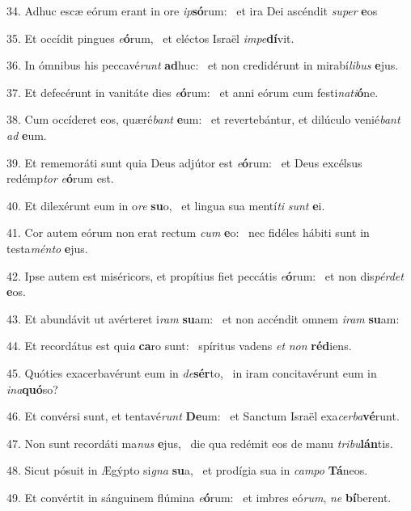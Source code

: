 34. Adhuc escæ eórum erant in ore \textit{ip}\textbf{só}rum: \ast\  et ira Dei ascéndit \textit{su}\textit{per} \textbf{e}os\

35. Et occídit pingues \textit{e}\textbf{ó}rum, \ast\  et eléctos Israël \textit{im}\textit{pe}\textbf{dí}vit.\

36. In ómnibus his peccavé\textit{runt} \textbf{ad}huc: \ast\  et non credidérunt in mirabí\textit{li}\textit{bus} \textbf{e}jus.\

37. Et defecérunt in vanitáte dies \textit{e}\textbf{ó}rum: \ast\  et anni eórum cum festi\textit{na}\textit{ti}\textbf{ó}ne.\

38. Cum occíderet eos, quæré\textit{bant} \textbf{e}um: \ast\  et revertebántur, et dilúculo venié\textit{bant} \textit{ad} \textbf{e}um.\

39. Et rememoráti sunt quia Deus adjútor est \textit{e}\textbf{ó}rum: \ast\  et Deus excélsus redémp\textit{tor} \textit{e}\textbf{ó}rum est.\

40. Et dilexérunt eum in o\textit{re} \textbf{su}o, \ast\  et lingua sua mentí\textit{ti} \textit{sunt} \textbf{e}i.\

41. Cor autem eórum non erat rectum \textit{cum} \textbf{e}o: \ast\  nec fidéles hábiti sunt in testa\textit{mén}\textit{to} \textbf{e}jus.\

42. Ipse autem est miséricors, et propítius fiet peccátis \textit{e}\textbf{ó}rum: \ast\  et non dis\textit{pér}\textit{det} \textbf{e}os.\

43. Et abundávit ut avérteret i\textit{ram} \textbf{su}am: \ast\  et non accéndit omnem \textit{i}\textit{ram} \textbf{su}am:\

44. Et recordátus est qui\textit{a} \textbf{ca}ro sunt: \ast\  spíritus vadens \textit{et} \textit{non} \textbf{réd}iens.\

45. Quóties exacerbavérunt eum in \textit{de}\textbf{sér}to, \ast\  in iram concitavérunt eum in \textit{in}\textit{a}\textbf{quó}so?\

46. Et convérsi sunt, et tentavé\textit{runt} \textbf{De}um: \ast\  et Sanctum Israël exa\textit{cer}\textit{ba}\textbf{vé}runt.\

47. Non sunt recordáti ma\textit{nus} \textbf{e}jus, \ast\  die qua redémit eos de manu \textit{tri}\textit{bu}\textbf{lán}tis.\

48. Sicut pósuit in Ægýpto si\textit{gna} \textbf{su}a, \ast\  et prodígia sua in \textit{cam}\textit{po} \textbf{Tá}neos.\

49. Et convértit in sánguinem flúmina \textit{e}\textbf{ó}rum: \ast\  et imbres eó\textit{rum}, \textit{ne} \textbf{bí}berent.\

